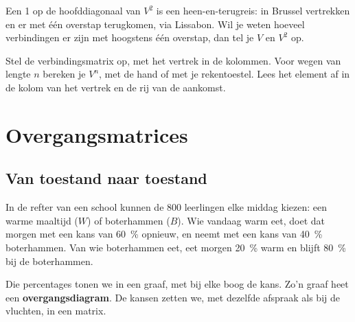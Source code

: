 Een 1 op de hoofddiagonaal van $V^2$ is een heen-en-terugreis: in Brussel vertrekken en er met één overstap terugkomen, via Lissabon. Wil je weten hoeveel verbindingen er zijn met hoogstens één overstap, dan tel je $V$ en $V^2$ op.

\begin{werkwijze}
Stel de verbindingsmatrix op, met het vertrek in de kolommen. Voor wegen van lengte $n$ bereken je $V^n$, met de hand of met je rekentoestel. Lees het element af in de kolom van het vertrek en de rij van de aankomst.
\end{werkwijze}


\begin{oefeningen}
\end{oefeningen}

\section{Overgangsmatrices}

\subsection{Van toestand naar toestand}

In de refter van een school kunnen de 800 leerlingen elke middag kiezen: een warme maaltijd ($W$) of boterhammen ($B$). Wie vandaag warm eet, doet dat morgen met een kans van 60~\% opnieuw, en neemt met een kans van 40~\% boterhammen. Van wie boterhammen eet, eet morgen 20~\% warm en blijft 80~\% bij de boterhammen.

Die percentages tonen we in een graaf, met bij elke boog de kans. Zo'n graaf heet een \textbf{overgangsdiagram}. De kansen zetten we, met dezelfde afspraak als bij de vluchten, in een matrix.



